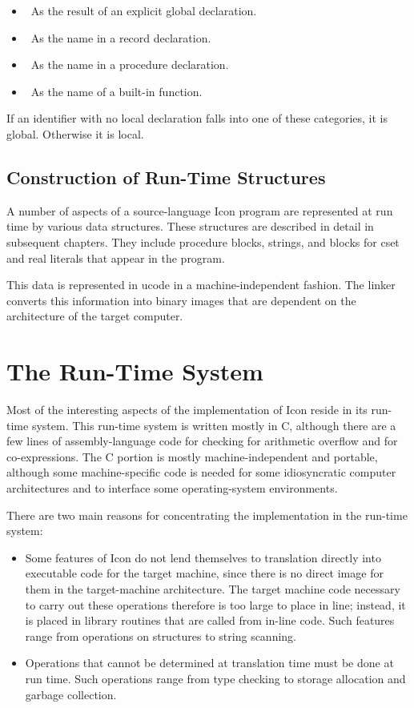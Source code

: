 \liststyleLii
\begin{itemize}
\item 
\ As the result of an explicit global declaration.
\item 
\ As the name in a record declaration.
\item 
\ As the name in a procedure declaration.
\item 
\ As the name of a built-in function.
\end{itemize}

If an identifier with no local declaration falls into one of these
categories, it is global. Otherwise it is local.

\subsection{Construction of Run-Time Structures}

A number of aspects of a source-language Icon program are represented
at run time by various data structures. These structures are described
in detail in subsequent chapters. They include procedure blocks,
strings, and blocks for cset and real literals that appear in the
program.


This data is represented in ucode in a machine-independent
fashion. The linker converts this information into binary images that
are dependent on the architecture of the target computer.

\section{The Run-Time System}

Most of the interesting aspects of the implementation of Icon reside
in its run-time system. This run-time system is written mostly in C,
although there are a few lines of assembly-language code for checking
for arithmetic overflow and for co-expressions. The C portion is
mostly machine-independent and portable, although some
machine-specific code is needed for some idiosyncratic computer
architectures and to interface some operating-system environments.

There are two main reasons for concentrating the implementation in the
run-time system:

\liststyleLiii
\begin{itemize}

\item Some features of Icon do not lend themselves to translation
directly into executable code for the target machine, since there is
no direct image for them in the target-machine architecture. The
target machine code necessary to carry out these operations therefore
is too large to place in line; instead, it is placed in library
routines that are called from in-line code. Such features range from
operations on structures to string scanning.

\item Operations that cannot be determined at translation time must be
done at run time. Such operations range from type checking to storage
allocation and garbage collection.

\end{itemize}

